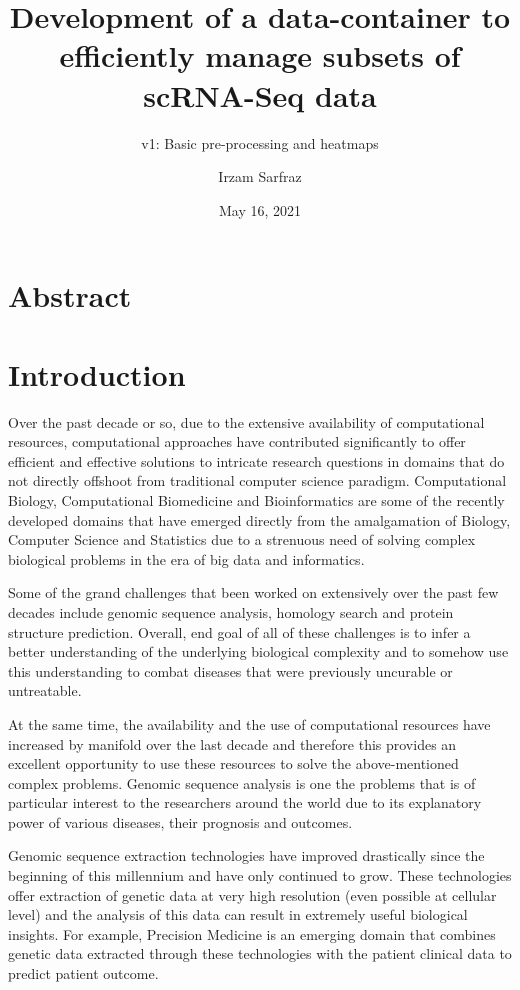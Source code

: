 \documentclass[
]{article}
\title{Development of a data-container to efficiently manage subsets of
scRNA-Seq data}
\subtitle{v1: Basic pre-processing and heatmaps}
\author{Irzam Sarfraz}
\date{May 16, 2021}
\begin{document}
\maketitle

{
\setcounter{tocdepth}{2}
\tableofcontents
}
\hypertarget{abstract}{%
\section*{Abstract}\label{abstract}}

\hypertarget{introduction}{%
\section{Introduction}\label{introduction}}

Over the past decade or so, due to the extensive availability of
computational resources, computational approaches have contributed
significantly to offer efficient and effective solutions to intricate
research questions in domains that do not directly offshoot from
traditional computer science paradigm. Computational Biology,
Computational Biomedicine and Bioinformatics are some of the recently
developed domains that have emerged directly from the amalgamation of
Biology, Computer Science and Statistics due to a strenuous need of
solving complex biological problems in the era of big data and
informatics.

Some of the grand challenges that been worked on extensively over the
past few decades include genomic sequence analysis, homology search and
protein structure prediction. Overall, end goal of all of these
challenges is to infer a better understanding of the underlying
biological complexity and to somehow use this understanding to combat
diseases that were previously uncurable or untreatable.

At the same time, the availability and the use of computational
resources have increased by manifold over the last decade and therefore
this provides an excellent opportunity to use these resources to solve
the above-mentioned complex problems. Genomic sequence analysis is one
the problems that is of particular interest to the researchers around
the world due to its explanatory power of various diseases, their
prognosis and outcomes.

Genomic sequence extraction technologies have improved drastically since
the beginning of this millennium and have only continued to grow. These
technologies offer extraction of genetic data at very high resolution
(even possible at cellular level) and the analysis of this data can
result in extremely useful biological insights. For example, Precision
Medicine is an emerging domain that combines genetic data extracted
through these technologies with the patient clinical data to predict
patient outcome.
\end{document}

